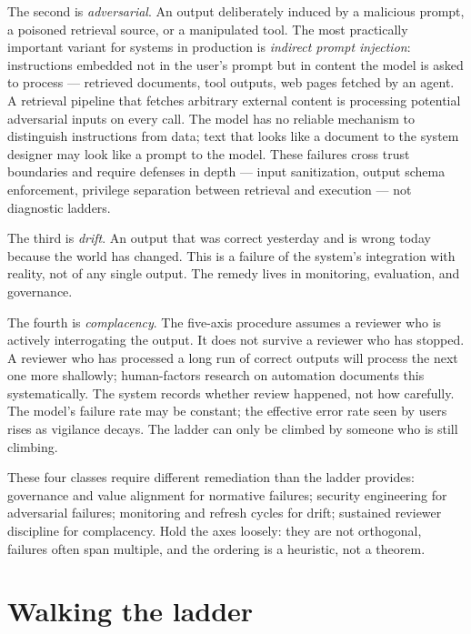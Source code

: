 \documentclass[11pt,a4paper]{article}
\begin{document}
The second is \emph{adversarial}. An output deliberately induced
by a malicious prompt, a poisoned retrieval source, or a
manipulated tool. The most practically important variant for
systems in production is \emph{indirect prompt injection}:
instructions embedded not in the user's prompt but in content the
model is asked to process --- retrieved documents, tool outputs,
web pages fetched by an agent. A retrieval pipeline that fetches
arbitrary external content is processing potential adversarial
inputs on every call. The model has no reliable mechanism to
distinguish instructions from data; text that looks like a
document to the system designer may look like a prompt to the
model. These failures cross trust boundaries and require defenses
in depth --- input sanitization, output schema enforcement,
privilege separation between retrieval and execution --- not
diagnostic ladders.

The third is \emph{drift}. An output that was correct yesterday
and is wrong today because the world has changed. This is a
failure of the system's integration with reality, not of any
single output. The remedy lives in monitoring, evaluation, and
governance.

The fourth is \emph{complacency}. The five-axis procedure assumes
a reviewer who is actively interrogating the output. It does not
survive a reviewer who has stopped. A reviewer who has processed
a long run of correct outputs will process the next one more
shallowly; human-factors research on automation documents this
systematically. The system records whether review happened, not
how carefully. The model's failure rate may be constant; the
effective error rate seen by users rises as vigilance decays.
The ladder can only be climbed by someone who is still climbing.

These four classes require different remediation than the ladder
provides: governance and value alignment for normative failures;
security engineering for adversarial failures; monitoring and
refresh cycles for drift; sustained reviewer discipline for
complacency. Hold the axes loosely: they are not orthogonal,
failures often span multiple, and the ordering is a heuristic,
not a theorem.

\section*{Walking the ladder}
\end{document}

